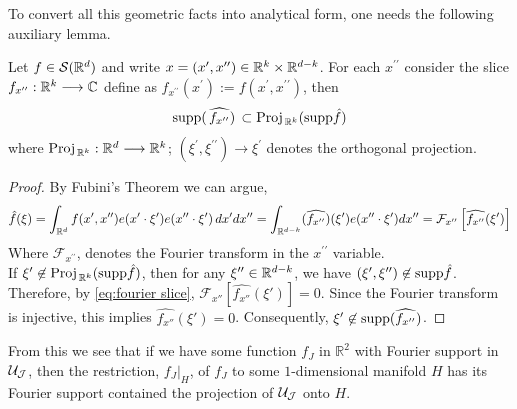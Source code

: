 To convert all this geometric facts into analytical form, one needs the following auxiliary lemma.
\begin{lem}\label{lem:fourier projecton} 
    Let $f\in \mathcal{S}(\mathbb{R}^d)$ and write $x=(x^{\prime},x^{\prime\prime})\in \mathbb{R}^{k} \times \mathbb{R}^{d-k}$. For each $x^{\prime\prime}$ consider the slice $f_{x^{\prime\prime}}: \mathbb{R}^{k}\longrightarrow \mathbb{C}$ define as $f_{x^{\prime\prime}}(x^{\prime}):=f(x^{\prime},x^{\prime\prime})$,
    then
    $$
    \text{supp}(\, \widehat{f_{x^{\prime\prime}}}) \,\subset \text{Proj}_{\,\mathbb{R}^{k} }(\text{supp} \hat{f})
    $$
    where $\text{Proj}_{\,\mathbb{R}^{k}}: \mathbb{R}^{d}\longrightarrow \mathbb{R}^{k}$; $(\xi^{\prime},\xi^{\prime\prime})\xrightarrow{}\xi^{\prime}$ denotes the orthogonal projection.
\end{lem}
\begin{proof}
    By Fubini's Theorem we can argue,
    \begin{equation}\label{eq:fourier slice}
        \hat{f}(\xi) = \int_{\mathbb{R}^d} f(x^{\prime},x^{\prime\prime}) e(x^{\prime }\cdot \xi^{\prime})e(x^{\prime\prime}\cdot \xi^{\prime})\, dx^{\prime}dx^{\prime\prime} = \int_{\mathbb{R}^{d-k}} (\widehat{f_{x^{\prime\prime}}})(\xi^{\prime})e(x^{\prime\prime}\cdot \xi^{\prime})dx^{\prime\prime} = \mathcal{F}_{x^{\prime\prime}}\left[ \widehat{f_{x^{\prime\prime}}}(\xi^{\prime})\right]
    \end{equation}
    Where $\mathcal{F}_{x^{\prime\prime}} $, denotes the Fourier transform in the $x^{\prime\prime}$ variable.\\
    
    If \(\xi' \not\in \text{Proj}_{\,\mathbb{R}^{k}}(\text{supp} \hat{f})\), then for any \(\xi'' \in \mathbb{R}^{d-k}\), we have \((\xi', \xi'') \not\in \text{supp} \hat{f}\). Therefore, by \eqref{eq:fourier slice}, \(\mathcal{F}_{x''}\left[\widehat{f_{x''}}(\xi')\right] = 0\). Since the Fourier transform is injective, this implies \(\widehat{f_{x''}}(\xi') = 0\). Consequently, \(\xi' \not\in \text{supp}(\widehat{f_{x''}})\).

\end{proof}

From this we see that if we have some function $f_{J}$ in $\mathbb{R}^{2}$ with Fourier support in $\cal{U}_{J}$, then the restriction, $\left.f_{J}\right|_{H}$, of $f_{J}$ to some $1$-dimensional manifold $H$ has its Fourier support contained the projection of $\cal{U}_{J}$ onto $H$.

